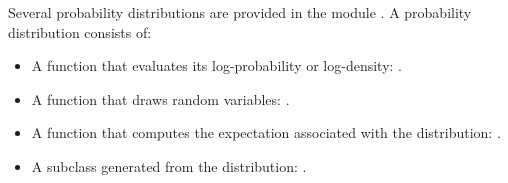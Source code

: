 \documentclass[]{jss}
\begin{document}
\label{sec:distributions}
Several probability distributions are provided in the module . A probability distribution consists of:
\begin{itemize}
    \item A function that evaluates its log-probability or log-density: .
    \item A function that draws random variables: .
    \item A function that computes the expectation associated with the distribution: .
    \item A  subclass generated from the distribution: .
\end{itemize} 
%



\end{document}
